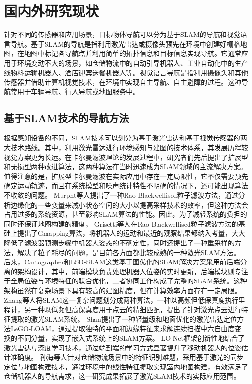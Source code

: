 \section{国内外研究现状}
    针对不同的传感器和应用场景，目标物体导航可以分为基于SLAM的导航和视觉语言导航。基于SLAM的导航是指利用激光雷达或摄像头预先在环境中创建好栅格地图，在地图中标记各导航点并利用简单的拓扑信息和目标信息实现导航。它通常应用于环境变动不大的场景，如仓储物流中的自动引导机器人、工业自动化中的生产线物料运输机器人、酒店迎宾送餐机器人等。视觉语言导航是指利用摄像头和其他传感器并借助计算机视觉技术，在环境中实现自主导航、自主避障的过程。这种导航常用于车辆导航、行人导航或地图服务中。

\subsection{基于SLAM技术的导航方法}
	
	根据感知设备的不同，SLAM技术可以划分为基于激光雷达和基于视觉传感器的两大技术路线。其中，利用激光雷达进行环境感知与建图的技术体系，其发展历程较视觉方案更为长远。在卡尔曼滤波理论的发展过程中，研究者们先后提出了扩展型和无损型两种改进算法，这两种算法在当时迅速成为SLAM领域的主流解决方案。值得注意的是，扩展型卡尔曼滤波在实际应用中存在一定局限性，它不仅需要预先确定运动轨迹，而且在系统模型和噪声统计特性不明确的情况下，还可能出现算法不收敛的问题。
	Murpht\cite{murphy2001rao}等人提出了一种Rao-Blackwellised粒子滤波方法，通过分析边缘化的一些变量来减小状态空间的大小以提高采样技术的效率，但这种方法会占用过多的系统资源，甚至影响SLAM算法的性能。因此，为了减轻系统的负担的同时还保证地图构建的精度，
	Grisetti\cite{grisetti2005improving, grisetti2007improved}等人在Rao-Blackwellised粒子滤波方法的基础上提出了Gmapping算法，将机器人的运动和最近的观察结果都纳入考量，大大降低了滤波器预测步骤中机器人姿态的不确定性，同时还提出了一种重采样的方法，解决了粒子耗尽的问题，是目前各方面都比较成熟的一种激光SLAM方法。
	后来，Cartographer\cite{hess2016real}和LSD-SLAM\cite{engel2014lsd}这类基于图优化的SLAM解决方案采用前后端分离的架构设计，其中，前端模块负责处理机器人位姿的实时更新，后端模块则专注于全局位姿与环境特征的联合优化，二者协同工作构成了完整的SLAM系统。这种架构虽然在复杂场景下具有较高的建图精度，但在计算效率方面存在一定局限。
	Zhang\cite{zhang2017low}等人将SLAM这一复杂问题划分成两种算法，一种以高频但低保真度执行里程计，另一种以低频但高保真度用于点云的精细匹配，提出了针对激光点云进行特征提取的激光SLAM系统。
	Shan\cite{shan2018lego}提出了一种轻量级和地面优化的激光雷达定位方法LeGO-LOAM，通过提取独特的平面和边缘特征来求解连续扫描中六自由度变换的不同分量，实现了嵌入式系统上的SLAM方案。
	LO-Net\cite{li2019net}框架创新性地结合了激光雷达与深度学习技术，通过端到端的学习方式显著提升了移动机器人的位姿估计准确度。
	孙海\cite{孙海2017激光测距在仓储搬运机器人运动中的应用}等人针对仓储物流场景中的特征识别难题，采用基于激光的同步定位与地图构建技术，通过环境中的线性特征提取实现室内地图构建，有效满足了仓储机器人的导航需求，这一研究成果拓展了激光SLAM技术的实际应用范围。

